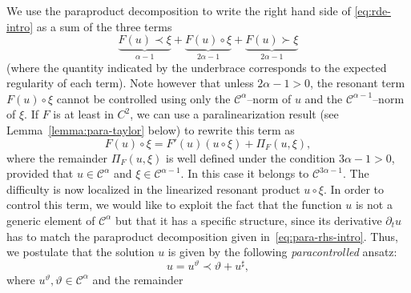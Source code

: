\documentclass[11pt,a4paper]{article}
\newcommand{\tmtextit}[1]{{\itshape{#1}}}
\theoremstyle{remark}
\newcommand{\CC}{\ensuremath{\mathscr{C}}}
\begin{document}
We use the paraproduct decomposition to write the right hand side of {\eqref{eq:rde-intro}} as a
sum of the three terms
\begin{equation}\label{eq:para-rhs-intro}
  \underbrace{F ( u ) \prec \xi}_{\alpha -1} + \underbrace{F ( u ) \circ  \xi}_{2 \alpha -1} + \underbrace{F ( u ) \succ \xi}_{2 \alpha -1}
\end{equation}
(where the quantity indicated by the underbrace corresponds to the expected regularity of each term). Note however that unless $2 \alpha -1>0$, the resonant term
$F ( u ) \circ   \xi$ cannot be controlled using only the $\CC^{\alpha}$--norm
of $u$ and the $\CC^{\alpha -1}$--norm of $\xi$. If $F$ is at least in $C^2$, we can use a paralinearization result (see Lemma~\ref{lemma:para-taylor} below) to rewrite this term as
\begin{equation}\label{eq:rde expand Fu}
   F ( u ) \circ \xi =F' ( u )  ( u \circ \xi ) + \Pi_{F} ( u, \xi ),
\end{equation}
where the remainder $\Pi_{F} ( u, \xi )$ is well defined under the condition
$3 \alpha -1>0$, provided that $u \in \CC^{\alpha}$ and $\xi \in \CC^{\alpha -1}$. In this case it belongs to $\CC^{3 \alpha -1}$. The
difficulty is now localized in the linearized resonant product $u \circ \xi$. In order to control this term, we would like to exploit the fact that
the function $u$ is not a generic element of $\CC^{\alpha}$ but that it has a
specific structure, since its derivative $\partial_{t} u$ has to match the
paraproduct decomposition given in~\eqref{eq:para-rhs-intro}. Thus, we postulate
that the solution $u$ is given by the following \tmtextit{paracontrolled} ansatz:
\[
   u=u^{\vartheta} \prec \vartheta +u^{\sharp},
\]
where $u^{\vartheta} , \vartheta \in \CC^{\alpha}$ and the remainder
\end{document}
